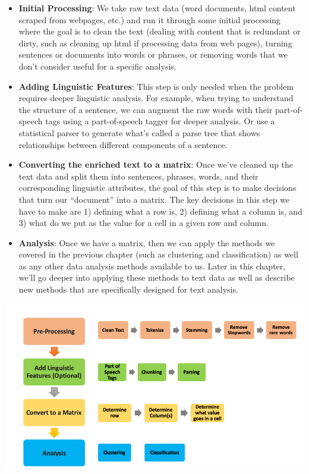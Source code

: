 \documentclass[]{krantz}
\begin{document}
\begin{itemize}
\item
  \textbf{Initial Processing}: We take raw text data (word documents,
  html content scraped from webpages, etc.) and run it through some
  initial processing where the goal is to clean the text (dealing with
  content that is redundant or dirty, such as cleaning up html if
  processing data from web pages), turning sentences or documents into
  words or phrases, or removing words that we don't consider useful for
  a specific analysis.
\item
  \textbf{Adding Linguistic Features}: This step is only needed when the
  problem requires deeper linguistic analysis. For example, when trying
  to understand the structure of a sentence, we can augment the raw
  words with their part-of-speech tags using a part-of-speech tagger for
  deeper analysis. Or use a statistical parser to generate what's called
  a parse tree that shows relationships between different components of
  a sentence.
\item
  \textbf{Converting the enriched text to a matrix}: Once we've cleaned
  up the text data and split them into sentences, phrases, words, and
  their corresponding linguistic attributes, the goal of this step is to
  make decisions that turn our ``document'' into a matrix. The key
  decisions in this step we have to make are 1) defining what a row is,
  2) defining what a column is, and 3) what do we put as the value for a
  cell in a given row and column.
\item
  \textbf{Analysis}: Once we have a matrix, then we can apply the
  methods we covered in the previous chapter (such as clustering and
  classification) as well as any other data analysis methods available
  to us. Later in this chapter, we'll go deeper into applying these
  methods to text data as well as describe new methods that are
  specifically designed for text analysis.
\end{itemize}

\begin{center}\includegraphics[width=0.9\linewidth]{ChapterText/figures/textanalysispipeline} \end{center}
\end{document}
